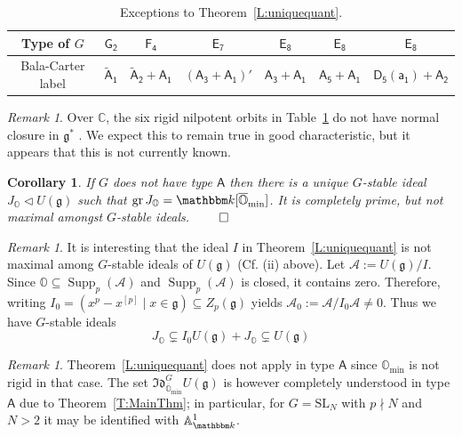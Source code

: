 \documentclass[twoside,12pt,reqno]{amsart}
\newtheorem{Corollary}[Theorem]{Corollary}
\theoremstyle{remark}
\newtheorem{Remark}[Theorem]{Remark}
\numberwithin{equation}{section}
\def\k{{\mathbbm k}}
\def\gr{\operatorname{gr}}
\def\Supp{\operatorname{Supp}}
\def\o{\overline}
\def\C{{\mathbb C}}
\def\O{{\mathbb O}}
\def\cO{{\overline{\mathbb O}}}
\def\sA{{\mathsf{A}}}
\def\sAa{{\mathsf{A_1}}}
\def\saa{{\mathsf{a_1}}}
\def\sAb{{\mathsf{A_2}}}
\def\sAc{{\mathsf{A_3}}}
\def\sAe{{\mathsf{A_5}}}
\def\sDe{{\mathsf{D_5}}}
\def\sEj{{\mathsf{E_7}}}
\def\sEk{{\mathsf{E_8}}}
\def\sF{{\mathsf{F_4}}}
\def\sG{{\mathsf{G_2}}}
\def\SL{\mathrm{SL}}
\def\g{{\mathfrak g}}
\def\Idl{\mathfrak{Id}}
\newcommand{\A}{\mathcal{A}}
\renewcommand{\min}{\operatorname{min}}
\begin{document}
	\renewcommand{\arraystretch}{1.5}
	\begin{center}
    \begin{table}[h] \caption{Exceptions to Theorem~\ref{L:uniquequant}.}\label{ta: BadOrbs}
		\begin{tabular}{|c||c|c|c|c|c|c|}
        \hline
			Type of $G$ & $\sG$ & $\sF$ & $\sEj$ & $\sEk$ & $\sEk$ & $\sEk$ \\
			\hline
			Bala-Carter label & $\widetilde{\sA}_{\mathsf 1}$ & $\widetilde{\sA}_{\mathsf 2}+\sAa$ & $(\sAc+\sAa)'$ & $\sAc+\sAa$ & $\sAe+\sAa$ & $\sDe(\saa)+\sAb$ \\
            \hline
		\end{tabular}
        \end{table}
	\end{center}
\begin{Remark}
    Over $\C$, the six rigid nilpotent orbits in Table~\ref{ta: BadOrbs} do not have normal closure in $\g^*$ \cite{Br1,Br2,Kr}. We expect this to remain true in good characteristic, but it appears that this is not currently known.     
\end{Remark}

\begin{Corollary}\label{C:UniqMinQuant}
    If $G$ does not have type $\sA$ then there is a unique $G$-stable ideal $J_{\O}\lhd U(\g)$ such that $\gr J_{\O} = \k[\o\O_{\min}]$. It is completely prime, but not maximal amongst $G$-stable ideals. $\hfill \qed$
\end{Corollary}
    
\begin{Remark}
    It is interesting that the ideal $I$ in Theorem~\ref{L:uniquequant} is not maximal among $G$-stable ideals of $U(\g)$ (Cf. (ii) above). Let $\A := U(\g) / I$. Since $\O \subseteq \Supp_p(\A)$ and $\Supp_p(\A)$ is closed, it contains zero. Therefore, writing $I_0 = (x^p - x^{[p]} \mid x\in \g) \subseteq Z_p(\g)$ yields $\A_0 := \A/I_0\A \ne 0$. Thus we have $G$-stable ideals
    $$J_\O \subsetneq I_0U(\g) + J_\O \subsetneq U(\g) $$
\end{Remark}



\begin{Remark}
    Theorem~\ref{L:uniquequant} does not apply in type $\sA$ since $\O_{\min}$ is not rigid in that case. The set $\Idl_{\cO_{\min}}^G U(\g)$ is however completely understood in type $\sA$ due to Theorem~\ref{T:MainThm}; in particular, for $G=\SL_N$ with $p\nmid N$ and $N> 2$ it may be identified with $\mathbb{A}_\k^1$.
\end{Remark}
\end{document}
